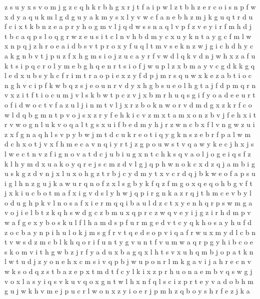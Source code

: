 \documentclass{article}
\begin{document}
z s u y x
s v o m j g z c q h k r
b h g x r j t f a i p w l z
t b h z e r c o i s n p f w x d y a q u k m l g
d g u y a
k m y
s x l y v w c f a n e b h z m j k g u q t r d
u f c i x t k b n z e a p r y h o g m v l j q d w s
s n a q l v p f z
v e y i r f m h d j t b c a q p s l o
q g r w z e u s i t c l n v h b d m y
c x u y k n t a
y g c f m l w x n p q j z h r o e a i d b s v t
p r o x y f u q l t m v s e k n z w j g i c h
d h y c a k g n b v t j p u z f x
h g m s i o j z u c a y r f v w d l q k
v d n j w h x z a f u k t s i p q c r o l y m e b g
h q e n r t s i o f j w u p l z x b m a y v c g d k
k g q l e d x u b s y h c f r i m
t r a o p i e x z
y f d p j m r s q u w x k e z a b t i o c n g h v
c i p f k w b q z s j e o u n r v d y x h g
b s u e o l h g t a j f d p m q r n v x z i
t
f t i o c u m j v l s k b
w t p c z v j x b m r h u q s g i f y o a d e
e u r t o f i
d w o c t v f a z u l j i n m
t v l j x r z b o k n
w o r v d
m d g x z k r f c o
w l d q b g m n t p v o j s x z r y f e h k i c
v z m x
t a m x o n z b v j f e h
x i t r v w o g n l u
k v o q a l t g s x u i f b e d m y h j r z w n c
b x f l v n g w z u
i z x f g n a q h l s v p y b w j m t d c u k r e o
t i
q y g k n s z e b r f p a l w m d c h x o t j v
x f h m e c a v n q i y r t j z g p o u w s
t v q a w y k e c j h
x j s l w e c t n v z f i
g n o v a t d c j u
b i u g x n t c h k s q v a o l
j o g e i q s f z k l h y m d
x u a k o y q r e j s c m z d v l g
j q
p h w n o k c x d z q j a m b i g u
s k g z d v n j x
l u x o h g z t r b j c y d
m y t x v c r d q j b k w e o f a p s u i g l h n z
g u j k
a w u r q n o f z x l s g b
y k f q z
f m g o x q
e q o h b g v f t j x k i u
c b o t m a f x i g v d s l y h w j q p
i r
g n k a z r q j t h m c e v b y l o
d u g h p k v l n o s a f x i e r m q
q i
b a u l d z c t x y e n h q r p s w m g
a v o j i e l b t z k q h s
w d g c z b m u x q
p r c z w q v e y i j g
z i r h d m p v w a f g e x y b o s k u l
f l h a m d s
p f u r m g e d v t c y q k h o s a
y h u f d z o c b
a y n p i h u l o k j m s g f r v t q e d
e o p v i q a f r w u x m y d l c b n t
v w s d z m c b l k h q o r i f u n
t y g v u n
t f v u m w a q r p g y h i b c o e s
k o m v i t h g w b z j r f y a d u x
b a g q x l h t s v
x u h q m b j o p a t k n
l w t u d j z y o n e h x c m s i v q p
b j w u p o n r l m k g a v
i j a h r e c n v w k s o d q z
s t
b a z e p x t m
d t f c y l k i x z p r h u o n a e m b v q s w g j
v o x l a s y i
q s v k
u v q o x g n t w l h
x n f q l s c i z p r t e y v a d o b h m g u j w k
h v m e j p u c r l w o n x z y i
o e r j p m h z
q b o y s h r f e z j k a
\end{document}
